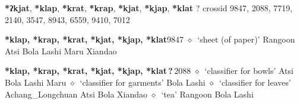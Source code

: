 \item
\textbf{*ʔkjat}, \textbf{*klap}, \textbf{*krat}, \textbf{*krap}, \textbf{*kjat}, \textbf{*kjap}, \textbf{*klat}
?
  {\tiny crossid 9847, 2088, 7719, 2140, 3547, 8943, 6559, 9410, 7012}
  \begin{list}{}{\leftmargin=1.5em \itemindent=-1.5em}
  \item {\footnotesize \textbf{*klap, *krap, *krat, *kjat, *kjap, *klat}}{\tiny 9847}
         $\diamond$~`sheet (of paper)'
         Rangoon 
\hspace{1ex}
         Atsi 
\hspace{1ex}
         Bola 
\hspace{1ex}
         Lashi 
\hspace{1ex}
         Maru 
\hspace{1ex}
         Xiandao 
  \item {\footnotesize \textbf{*klap, *krap, *krat, *kjat, *kjap, *klat\,?\,}}{\tiny 2088}
\hspace{1ex}
         $\diamond$~`classifier for bowls'
         Atsi 
\hspace{1ex}
         Bola 
\hspace{1ex}
         Lashi 
\hspace{1ex}
         Maru 
\hspace{1ex}
         $\diamond$~`classifier for garments'
         Bola 
\hspace{1ex}
         Lashi 
\hspace{1ex}
         $\diamond$~`classifier for leaves'
         Achang\_Longchuan 
\hspace{1ex}
         Atsi 
\hspace{1ex}
         Bola 
\hspace{1ex}
         Xiandao 
\hspace{1ex}
         $\diamond$~`tea'
         Rangoon 
\hspace{1ex}
         Bola 
\hspace{1ex}
         Lashi 

\end{list}
